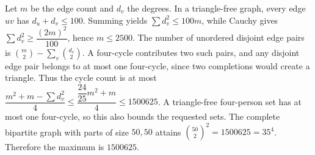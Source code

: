 Let $m$ be the edge count and $d_v$ the degrees. In a triangle-free graph, every edge $uv$ has $d_u+d_v\le100$. Summing yields $\sum d_v^2\le100m$, while Cauchy gives $\sum d_v^2\ge\dfrac{(2m)^2}{100}$, hence $m\le2500$. The number of unordered disjoint edge pairs is $\binom m2-\sum_v\binom{d_v}{2}$. A four-cycle contributes two such pairs, and any disjoint edge pair belongs to at most one four-cycle, since two completions would create a triangle. Thus the cycle count is at most $\dfrac{m^2+m-\sum d_v^2}{4}\le\dfrac{\dfrac{24}{25}m^2+m}{4}\le1500625$. A triangle-free four-person set has at most one four-cycle, so this also bounds the requested sets. The complete bipartite graph with parts of size $50,50$ attains $\binom{50}{2}^2=1500625=35^4$. Therefore the maximum is $\boxed{1500625}$.
